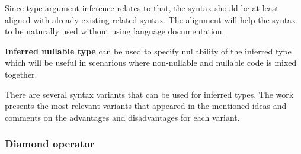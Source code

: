 Since type argument inference relates to that, the syntax should be at least aligned with already existing related syntax. 
The alignment will help the syntax to be naturally used without using language documentation.
\par
\textbf{Inferred nullable type} can be used to specify nullability of the inferred type which will be useful in scenarious where non-nullable and nullable code is mixed together.
\par
There are several syntax variants that can be used for inferred types. 
The work presents the most relevant variants that appeared in the mentioned ideas and comments on the advantages and disadvantages for each variant.

\subsubsection{Diamond operator} 


